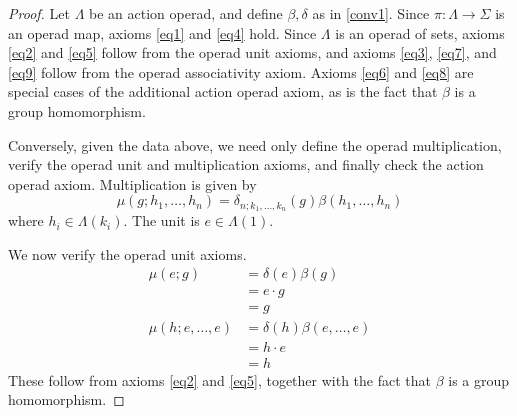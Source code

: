 \begin{proof}
Let $\Lambda$ be an action operad, and define $\beta, \delta$ as in \cref{conv1}. Since $\pi \colon \Lambda \rightarrow \Sigma$ is an operad map, axioms \eqref{eq1} and \eqref{eq4} hold. Since $\Lambda$ is an operad of sets, axioms \eqref{eq2} and \eqref{eq5} follow from the operad unit axioms, and axioms \eqref{eq3}, \eqref{eq7}, and \eqref{eq9} follow from the operad associativity axiom. Axioms \eqref{eq6} and \eqref{eq8} are special cases of the additional action operad axiom, as is the fact that $\beta$ is a group homomorphism.

Conversely, given the data above, we need only define the operad multiplication, verify the operad unit and multiplication axioms,  and finally check the action operad axiom. Multiplication is given by
  \[
    \mu(g; h_{1}, \ldots, h_{n}) = \delta_{n; k_{1}, \ldots, k_{n}}(g) \beta(h_{1}, \ldots, h_{n})
  \]
where $h_{i} \in \Lambda(k_{i})$. The unit is $e \in \Lambda(1)$.

We now verify the operad unit axioms.
  \begin{align*}
    \mu(e; g) &= \delta(e)\beta(g) \\
    &= e \cdot g \\
    &= g \\
    \mu(h; e, \ldots, e) &= \delta(h)\beta(e, \ldots, e) \\
    &= h \cdot e \\
    &= h
  \end{align*}
These follow from axioms \eqref{eq2} and \eqref{eq5}, together with the fact that $\beta$ is a group homomorphism.


\end{proof}
